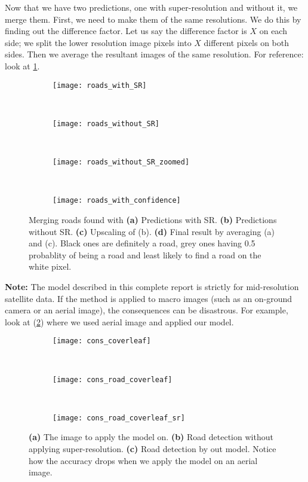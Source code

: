 Now that we have two predictions, one with super-resolution and without it, we merge them. First, we need to make them of the same resolutions. We do this by finding out the difference factor. Let us say the difference factor is $X$ on each side; we split the lower resolution image pixels into $X$ different pixels on both sides. Then we average the resultant images of the same resolution. For reference: look at \cref{fig:roads_in_confidence}.

\begin{figure}[h!]
  \begin{subfigure}[b]{0.25\textwidth}
    \texttt{[image: roads\_with\_SR]}
    \caption{}
  \end{subfigure}~
  \begin{subfigure}[b]{0.15\textwidth}
    \texttt{[image: roads\_without\_SR]}
    \caption{}
  \end{subfigure}~
  \begin{subfigure}[b]{0.25\textwidth}
    \texttt{[image: roads\_without\_SR\_zoomed]}
    \caption{}
  \end{subfigure}~
  \begin{subfigure}[b]{0.25\textwidth}
    \texttt{[image: roads\_with\_confidence]}
    \caption{}
  \end{subfigure}
  \caption[Finding likelihood of roads in predictions]{Merging roads found with \textbf{(a)} Predictions with SR. \textbf{(b)} Predictions without SR. \textbf{(c)} Upscaling of (b). \textbf{(d)} Final result by averaging (a) and (c). Black ones are definitely a road, grey ones having 0.5 probablity of being a road and least likely to find a road on the white pixel.}
  \label{fig:roads_in_confidence}
\end{figure}

\textbf{Note:} The model described in this complete report is strictly for mid-resolution satellite data. If the method is applied to macro images (such as an on-ground camera or an aerial image), the consequences can be disastrous. For example, look at (\cref{fig:cons_coverleaf}) where we used aerial image and applied our model.

\begin{figure}[h!]
  \centering
  \begin{subfigure}{0.3\textwidth}
    \texttt{[image: cons\_coverleaf]}
    \caption{}
  \end{subfigure}~
  \begin{subfigure}{0.3\textwidth}
    \texttt{[image: cons\_road\_coverleaf]}
    \caption{}
  \end{subfigure}~
  \begin{subfigure}{0.3\textwidth}
    \texttt{[image: cons\_road\_coverleaf\_sr]}
    \caption{}
  \end{subfigure}
  \caption[Disastors in applying the model on unexpected images]{\textbf{(a)} The image to apply the model on. \textbf{(b)} Road detection without applying super-resolution. \textbf{(c)} Road detection by out model. Notice how the accuracy drops when we apply the model on an aerial image.}
  \label{fig:cons_coverleaf}
\end{figure}

